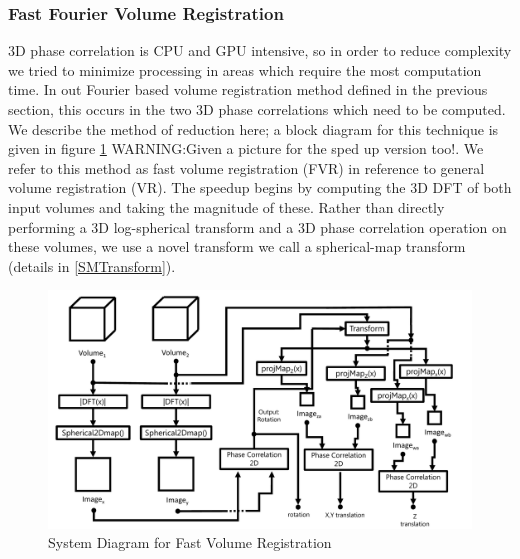 \subsubsection{Fast Fourier Volume Registration}

3D phase correlation is CPU and GPU intensive, so in order to reduce complexity we tried to minimize processing in areas which require the most computation time. In out Fourier based volume registration method defined in the previous section, this occurs in the two 3D phase correlations which need to be computed. We describe the method of reduction here; a block diagram for this technique is given in figure \ref{fig:PIPELINE3} WARNING:Given a picture for the sped up version too!. We refer to this method as fast volume registration (FVR) in reference to general volume registration (VR). The speedup begins by computing the 3D DFT of both input volumes and taking the magnitude of these. Rather than directly performing a 3D log-spherical transform and a 3D phase correlation operation on these volumes, we use a novel transform we call a spherical-map transform (details in \ref{SMTransform}).\\

\begin{figure}[!htb]
\centering
\includegraphics[width=5.0in]{images/ch2/pipeline3}
\caption{System Diagram for Fast Volume Registration}
\label{fig:PIPELINE3}
\end{figure}

